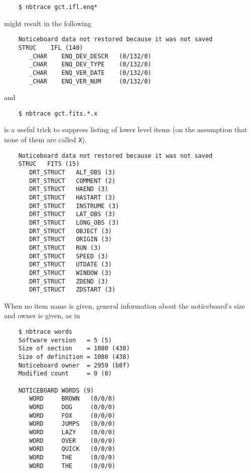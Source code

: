 \documentclass[twoside,11pt]{article}
\renewcommand{\_}{\texttt{\symbol{95}}}
\begin{document}
\begin{verbatim}
    $ nbtrace gct.ifl.enq*
\end{verbatim}

might result in the following

\begin{verbatim}
    Noticeboard data not restored because it was not saved
    STRUC    IFL (140)  
       _CHAR    ENQ_DEV_DESCR   (0/132/0) 
       _CHAR    ENQ_DEV_TYPE    (0/132/0) 
       _CHAR    ENQ_VER_DATE    (0/132/0) 
       _CHAR    ENQ_VER_NUM     (0/132/0) 
\end{verbatim}

and

\begin{verbatim}
    $ nbtrace gct.fits.*.x
\end{verbatim}

is a useful trick to suppress listing of lower level items (on the assumption
that none of them are called {\tt X}).

\begin{verbatim}
    Noticeboard data not restored because it was not saved
    STRUC   FITS (15)       
       DRT_STRUCT   ALT_OBS (3)     
       DRT_STRUCT   COMMENT (2)     
       DRT_STRUCT   HAEND (3)       
       DRT_STRUCT   HASTART (3)     
       DRT_STRUCT   INSTRUME (3)    
       DRT_STRUCT   LAT_OBS (3)     
       DRT_STRUCT   LONG_OBS (3)    
       DRT_STRUCT   OBJECT (3)      
       DRT_STRUCT   ORIGIN (3)      
       DRT_STRUCT   RUN (3) 
       DRT_STRUCT   SPEED (3)       
       DRT_STRUCT   UTDATE (3)      
       DRT_STRUCT   WINDOW (3)      
       DRT_STRUCT   ZDEND (3)       
       DRT_STRUCT   ZDSTART (3)	
\end{verbatim}

When no item name is given, general information about the noticeboard's size
and owner is given, as in

\begin {verbatim}
    $ nbtrace words
    Software version   = 5 (5)
    Size of section    = 1080 (438)
    Size of definition = 1080 (438)
    Noticeboard owner  = 2959 (b8f)
    Modified count     = 0 (0)

    NOTICEBOARD WORDS (9)
       WORD     BROWN   (0/0/0)
       WORD     DOG     (0/0/0)
       WORD     FOX     (0/0/0)
       WORD     JUMPS   (0/0/0)
       WORD     LAZY    (0/0/0)
       WORD     OVER    (0/0/0)
       WORD     QUICK   (0/0/0)
       WORD     THE     (0/0/0)
       WORD     THE     (0/0/0)
\end{verbatim}
\end{document}
